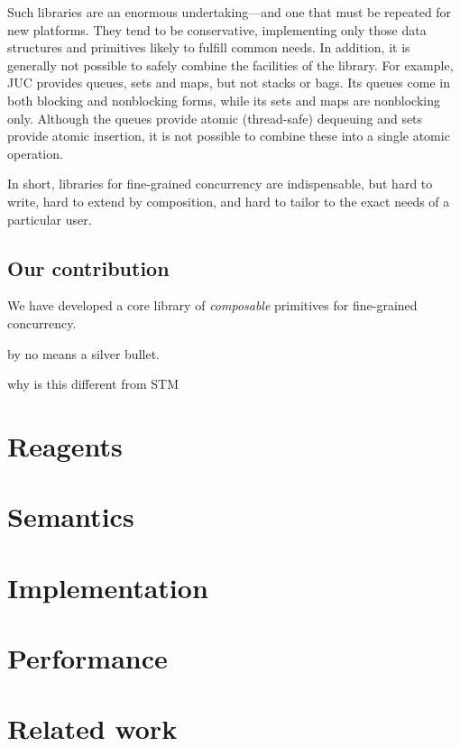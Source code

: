 \documentclass[preprint]{sigplanconf}
\newcommand{\GA}{\ |\ }
\newcommand{\kw}[1]{\textsf{#1}}
\begin{document}
Such libraries are an enormous undertaking---and one that must be repeated for
new platforms.  They tend to be conservative, implementing only those data
structures and primitives likely to fulfill common needs.  In addition, it is
generally not possible to safely combine the facilities of the library.  For
example, JUC provides queues, sets and maps, but not stacks or bags.  Its
queues come in both blocking and nonblocking forms, while its sets and maps
are nonblocking only.  Although the queues provide atomic (thread-safe)
dequeuing and sets provide atomic insertion, it is not possible to combine
these into a single atomic operation.  

In short, libraries for fine-grained concurrency are indispensable, but hard
to write, hard to extend by composition, and hard to tailor to the exact needs
of a particular user.

\subsection*{Our contribution}

We have developed a core library of \emph{composable} primitives for
fine-grained concurrency.

by no means a silver bullet.

why is this different from STM

\section{Reagents}
\label{sec:reagents}



\section{Semantics}
\label{sec:semantics}

\newcommand{\kw}[1]{\textsf{#1}}

\newcommand{\ret}[1]{\kw{ret}(#1)}
\newcommand{\never}{\kw{never}}
\newcommand{\postCommit}[1]{\kw{postCommit}(#1)}
\newcommand{\computed}[1]{\kw{computed}(#1)}
\newcommand{\compose}{{\small\texttt{>=>}}}
\newcommand{\lift}[1]{\kw{lift}(#1)}
\newcommand{\send}[1]{#1}
\newcommand{\cas}[3]{\kw{cas}(#1,#2,#3)}
\newcommand{\read}[1]{\kw{read}(#1)}
\newcommand{\newChan}{\kw{new Chan}}
\newcommand{\newRef}[1]{\kw{new Ref(#1)}}

\newcommand{\GA}{\ |\ }



\section{Implementation}
\label{sec:implementation}



\section{Performance}
\label{sec:performance}



\section{Related work}
\label{sec:related}




\end{document}
